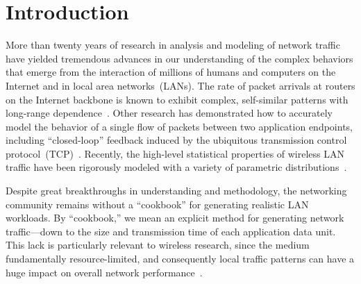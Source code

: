 \documentclass[twocolumn,final]{svjour3}
\newcommand{\caps}[1]{{\small{#1}}}
\begin{document}
\section{Introduction}\label{sec:intro}



More than twenty years of research in analysis and modeling of network traffic have yielded tremendous advances in our understanding of the complex behaviors that emerge from the interaction of millions of humans and computers on the Internet and in local area networks~(\caps{LAN}s). The rate of packet arrivals at routers on the Internet backbone is known to exhibit complex, self-similar patterns with long-range dependence~\cite{Paxson95,Paxson96,Willinger98}. Other research has demonstrated how to accurately model the behavior of a single flow of packets between two application endpoints, including ``closed-loop'' feedback induced by the ubiquitous transmission control protocol~(\caps{TCP})~\cite{Hernandez06:dissertation}. Recently, the high-level statistical properties of wireless \caps{LAN} traffic have been rigorously modeled with a variety of parametric distributions~\cite{Hernandez06:wlan-traffic}.

Despite great breakthroughs in understanding and methodology, the networking community remains without a ``cookbook'' for generating realistic \caps{LAN} workloads. By ``cookbook,'' we mean an explicit method for generating network traffic---down to the size and transmission time of each application data unit. This lack is particularly relevant to wireless research, since the medium fundamentally resource-limited, and consequently local traffic patterns can have a huge impact on overall network performance~\cite{Karpinski07:realism,Karpinski07:cbr-failure}.
\end{document}
